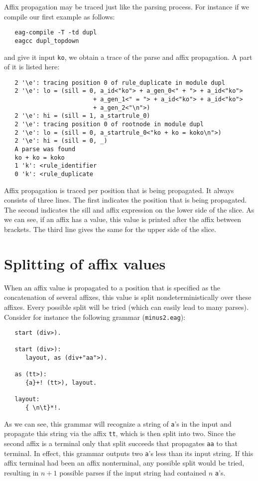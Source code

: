 Affix propagation may be traced just like the parsing process.
For instance if we compile our first example as follows:
\begin{verbatim}
   eag-compile -T -td dupl
   eagcc dupl_topdown
\end{verbatim}
and give it input {\tt ko}, we obtain a trace of the parse and
affix propagation. A part of it is listed here:
\begin{verbatim}
   2 '\e': tracing position 0 of rule_duplicate in module dupl
   2 '\e': lo = (sill = 0, a_id<"ko"> + a_gen_0<" + "> + a_id<"ko">
                         + a_gen_1<" = "> + a_id<"ko"> + a_id<"ko">
                         + a_gen_2<"\n">)
   2 '\e': hi = (sill = 1, a_startrule_0)
   2 '\e': tracing position 0 of rootnode in module dupl
   2 '\e': lo = (sill = 0, a_startrule_0<"ko + ko = koko\n">)
   2 '\e': hi = (sill = 0, _)
   A parse was found
   ko + ko = koko
   1 'k': <rule_identifier
   0 'k': <rule_duplicate
\end{verbatim}
Affix propagation is traced per position that is being propagated.
It always consists of three lines. The first indicates the position
that is being propagated. The second indicates the sill and affix expression
on the lower side of the slice. As we can see, if an affix
has a value, this value is printed after the affix between brackets.
The third line gives the same for the upper side of the slice.
\section {Splitting of affix values}
When an affix value is propagated to a position that is specified as
the concatenation of several affixes, this value is split
nondeterministically over these affixes. Every possible split will
be tried (which can easily lead to many parses).
Consider for instance the following grammar ({\tt minus2.eag}):
\begin{verbatim}
   start (div>).

   start (div>):
      layout, as (div+"aa">).

   as (tt>):
      {a}+! (tt>), layout.

   layout:
      { \n\t}*!.
\end{verbatim}
As we can see, this grammar will recognize a string of {\tt a}'s in the
input and propagate this string via the affix {\tt tt}, which is then
split into two. Since the second affix is a terminal only that split
succeeds that propagates {\tt aa} to that terminal. In effect, this
grammar outputs two {\tt a}'s less than its input string. If this
affix terminal had been an affix nonterminal, any possible split would
be tried, resulting in $n+1$ possible parses if the input string had
contained $n$ {\tt a}'s.
